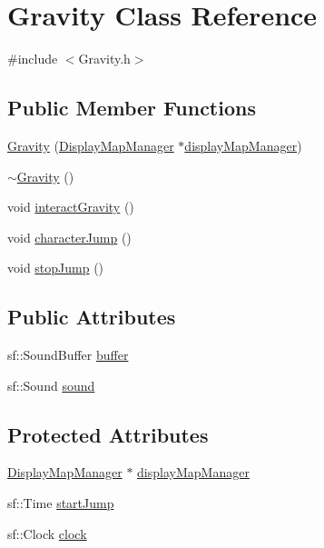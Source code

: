 \hypertarget{class_gravity}{}\section{Gravity Class Reference}
\label{class_gravity}


{\ttfamily \#include $<$Gravity.\+h$>$}

\subsection*{Public Member Functions}
\begin{DoxyCompactItemize}
\item 
\hyperlink{class_gravity_a366c547f2ab1425b5e6981b15a55852d}{Gravity} (\hyperlink{class_display_map_manager}{Display\+Map\+Manager} $\ast$\hyperlink{class_gravity_a72a7e04f7555e0f29d100c965ff5080f}{display\+Map\+Manager})
\item 
\hyperlink{class_gravity_a6fcaf5f5f0d4672c4a1d97a3102e053a}{$\sim$\+Gravity} ()
\item 
void \hyperlink{class_gravity_a350121b3d211c4740f3715acc64987e3}{interact\+Gravity} ()
\item 
void \hyperlink{class_gravity_adb2abc628833f3424ad3ddb93e581290}{character\+Jump} ()
\item 
void \hyperlink{class_gravity_a827989f236cfa0cb2732869f352b4057}{stop\+Jump} ()
\end{DoxyCompactItemize}
\subsection*{Public Attributes}
\begin{DoxyCompactItemize}
\item 
sf\+::\+Sound\+Buffer \hyperlink{class_gravity_a3a942e2b771c8a764914cb18c8bef394}{buffer}
\item 
sf\+::\+Sound \hyperlink{class_gravity_a5d636ab38b930cff4d585bfd374479b6}{sound}
\end{DoxyCompactItemize}
\subsection*{Protected Attributes}
\begin{DoxyCompactItemize}
\item 
\hyperlink{class_display_map_manager}{Display\+Map\+Manager} $\ast$ \hyperlink{class_gravity_a72a7e04f7555e0f29d100c965ff5080f}{display\+Map\+Manager}
\item 
sf\+::\+Time \hyperlink{class_gravity_a9284458ed2208a9df9ea8f1bf1b6c36a}{start\+Jump}
\item 
sf\+::\+Clock \hyperlink{class_gravity_ac126e399cf8cc40a6267b8f099865042}{clock}
\end{DoxyCompactItemize}


